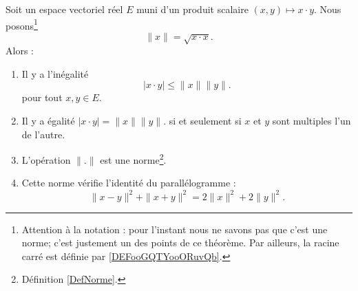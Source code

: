\begin{theorem}      \label{ThoAYfEHG}
	Soit un espace vectoriel réel \( E\) muni d'un produit scalaire \( (x,y)\mapsto x\cdot y\). Nous posons\footnote{Attention à la notation : pour l'instant nous ne savons pas que c'est une norme; c'est justement un des points de ce théorème. Par ailleurs, la racine carré est définie par \ref{DEFooGQTYooORuvQb}.}
	\begin{equation}
		\| x \|=\sqrt{ x\cdot x }.
	\end{equation}
	Alors :
	\begin{enumerate}
		\item
		      Il y a l'inégalité
		      \begin{equation}        \label{EQooZDSHooWPcryG}
			      | x\cdot y |\leq \| x \|\| y \|.
		      \end{equation}
		      pour tout \( x,y\in E\).
		\item
		      Il y a égalité \( | x\cdot y | = \| x \|\| y \|.\) si et seulement si \( x\) et \( y\) sont multiples l'un de l'autre.
		\item
		      L'opération \( \| . \|\) est une norme\footnote{Définition \ref{DefNorme}.}.
		\item
		      Cette norme vérifie l'identité du parallélogramme :
		      \begin{equation}        \label{EqYCLtWfJ}
			      \| x-y \|^2+\| x+y \|^2=2\| x \|^2+2\| y \|^2.
		      \end{equation}
	\end{enumerate}
\end{theorem}

